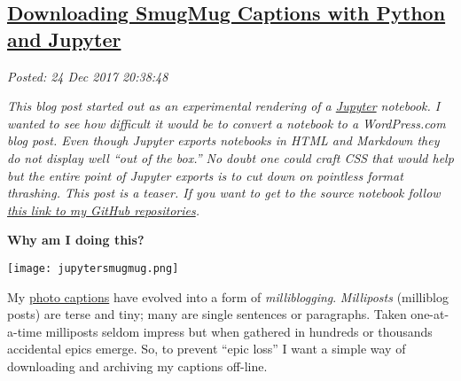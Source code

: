 %

\subsection*{\href{http://analyzethedatanotthedrivel.org/2017/12/24/downloading-smugmug-captions-with-python-and-jupyter/}{Downloading SmugMug Captions with Python and Jupyter}}


\noindent\emph{Posted: 24 Dec 2017 20:38:48}
\vspace{6pt}

\emph{This blog post started out as an experimental rendering of a
\href{https://jupyter.org/}{Jupyter} notebook. I wanted to see how
difficult it would be to convert a notebook to a WordPress.com blog
post. Even though Jupyter exports notebooks in HTML and Markdown they do
not display well ``out of the box.'' No doubt one could craft CSS that
would help but the entire point of Jupyter exports is to cut down on
pointless format thrashing. This post is a teaser. If you want to get to
the source notebook follow
\href{https://github.com/bakerjd99/smugpyter}{this link to my GitHub
repositories}.}


\medskip
\noindent\textbf{Why am I doing this?}
\medskip



\captionsetup[floatingfigure]{labelformat=empty}
\begin{floatingfigure}[r]{0.23\textwidth}
\centering
\texttt{[image: jupytersmugmug.png]}
\label{fig:5512x0}
\end{floatingfigure}My
\href{https://conceptcontrol.smugmug.com}{photo captions} have evolved
into a form of \emph{milliblogging}. \emph{Milliposts} (milliblog posts)
are terse and tiny; many are single sentences or paragraphs. Taken
one-at-a-time milliposts seldom impress but when gathered in hundreds or
thousands accidental epics emerge. So, to prevent ``epic loss'' I want a
simple way of downloading and archiving my captions off-line.


